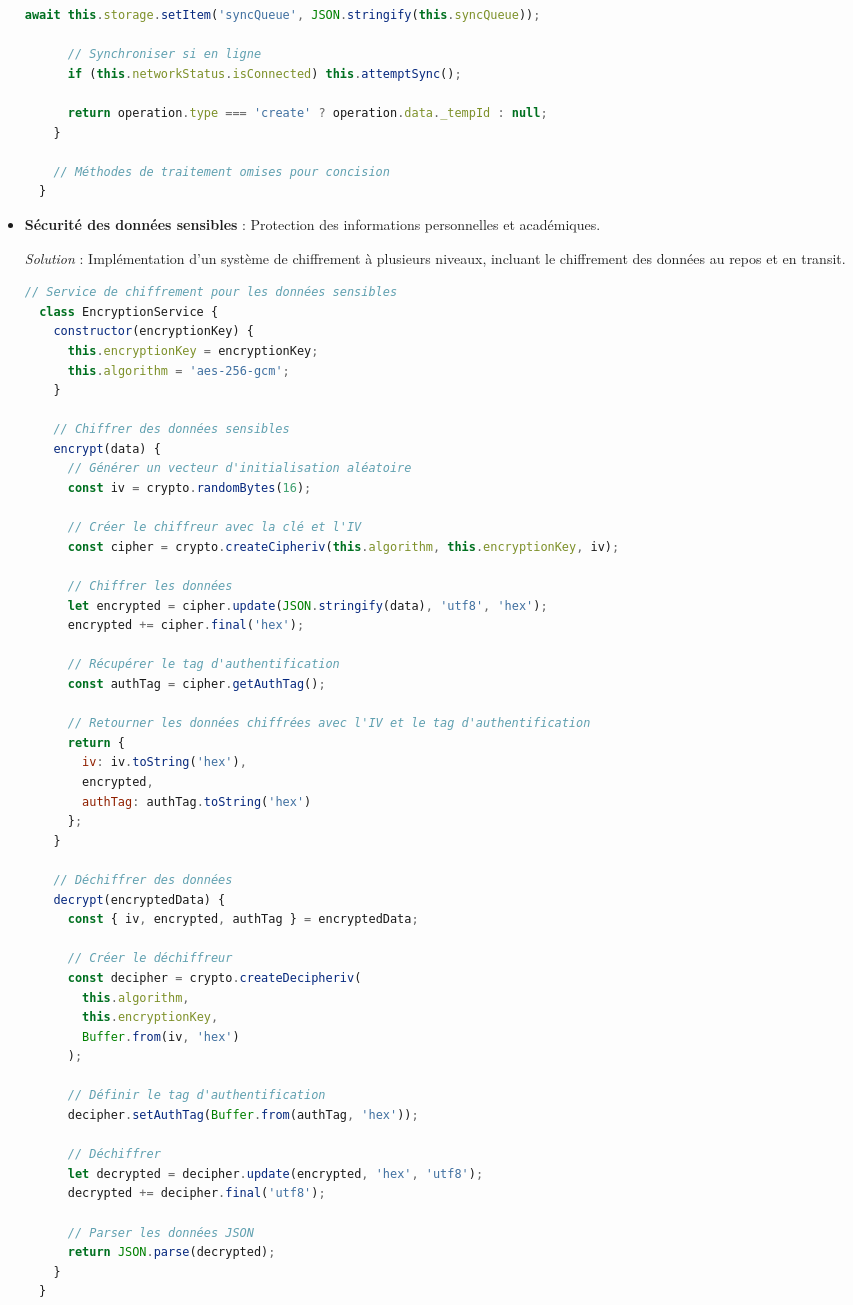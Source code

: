 \begin{itemize}
\begin{lstlisting}[style=codestyle, language=JavaScript]
      await this.storage.setItem('syncQueue', JSON.stringify(this.syncQueue));
      
      // Synchroniser si en ligne
      if (this.networkStatus.isConnected) this.attemptSync();
      
      return operation.type === 'create' ? operation.data._tempId : null;
    }
    
    // Méthodes de traitement omises pour concision
  }
  \end{lstlisting}
  
  \item \textbf{Sécurité des données sensibles} : Protection des informations personnelles et académiques.
  
  \textit{Solution} : Implémentation d'un système de chiffrement à plusieurs niveaux, incluant le chiffrement des données au repos et en transit.
  
  \begin{lstlisting}[style=codestyle, language=JavaScript]
  // Service de chiffrement pour les données sensibles
  class EncryptionService {
    constructor(encryptionKey) {
      this.encryptionKey = encryptionKey;
      this.algorithm = 'aes-256-gcm';
    }
    
    // Chiffrer des données sensibles
    encrypt(data) {
      // Générer un vecteur d'initialisation aléatoire
      const iv = crypto.randomBytes(16);
      
      // Créer le chiffreur avec la clé et l'IV
      const cipher = crypto.createCipheriv(this.algorithm, this.encryptionKey, iv);
      
      // Chiffrer les données
      let encrypted = cipher.update(JSON.stringify(data), 'utf8', 'hex');
      encrypted += cipher.final('hex');
      
      // Récupérer le tag d'authentification
      const authTag = cipher.getAuthTag();
      
      // Retourner les données chiffrées avec l'IV et le tag d'authentification
      return {
        iv: iv.toString('hex'),
        encrypted,
        authTag: authTag.toString('hex')
      };
    }
    
    // Déchiffrer des données
    decrypt(encryptedData) {
      const { iv, encrypted, authTag } = encryptedData;
      
      // Créer le déchiffreur
      const decipher = crypto.createDecipheriv(
        this.algorithm,
        this.encryptionKey,
        Buffer.from(iv, 'hex')
      );
      
      // Définir le tag d'authentification
      decipher.setAuthTag(Buffer.from(authTag, 'hex'));
      
      // Déchiffrer
      let decrypted = decipher.update(encrypted, 'hex', 'utf8');
      decrypted += decipher.final('utf8');
      
      // Parser les données JSON
      return JSON.parse(decrypted);
    }
  }
  \end{lstlisting}
\end{itemize}

